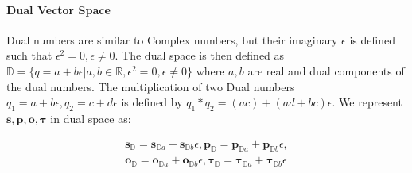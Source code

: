 \documentclass[letterpaper]{article} %
\begin{document}
\paragraph{\textbf{Dual Vector Space}} 
Dual numbers \cite{dualangeles1998application,metahelzer2000special} are  similar to Complex numbers, 
but their imaginary $\epsilon$ is defined such that $\epsilon^2 = 0, \epsilon \neq 0$.
The dual space is then defined as $\mathbb{D} = \{q = a + b \epsilon | a,b \in \mathbb{R}, \epsilon^2 = 0, \epsilon \neq 0\}$ where $a,b$ are real and dual components of the dual numbers. The multiplication of two Dual numbers $q_1= a+b\epsilon, q_2=c+d\epsilon$ is defined by $q_1 * q_2 = (ac) + (ad + bc) \epsilon$. We represent $\boldsymbol{s,p,o, \tau}$ in dual space as:

\begin{equation}
\label{eq:dual}
\begin{aligned}
        \boldsymbol{s_{\mathbb{D}}}=\boldsymbol{s}_{\mathbb{D}a} + \boldsymbol{s}_{\mathbb{D}b}\epsilon, \boldsymbol{p_{\mathbb{D}}}=\boldsymbol{p}_{\mathbb{D}a} + \boldsymbol{p}_{\mathbb{D}b}\epsilon,  \\ \boldsymbol{o_{\mathbb{D}}}=\boldsymbol{o}_{\mathbb{D}a} + \boldsymbol{o}_{\mathbb{D}b}\epsilon, \boldsymbol{\tau_{\mathbb{D}}}=\boldsymbol{\tau}_{\mathbb{D}a} + \boldsymbol{\tau}_{\mathbb{D}b}\epsilon
\end{aligned}
\end{equation}


\end{document}
